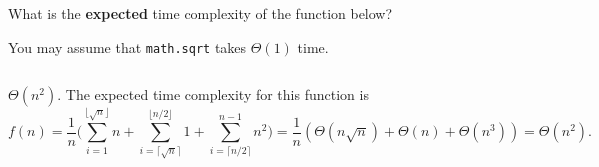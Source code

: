 \begin{prob}
    What is the \textbf{expected} time complexity of the function below?

    You may assume that \texttt{math.sqrt} takes $\Theta(1)$
    time.

    \inputminted{python}{./code.py}

    \begin{soln}
        $\Theta(n^2)$. The expected time complexity for this function is 
        \[ f(n) = \frac{1}{n} \bigg( \sum_{i = 1}^{\lfloor \sqrt{n} \rfloor} n + \sum_{i = \lceil \sqrt{n} \rceil}^{\lfloor n/2 \rfloor} 1 
        + \sum_{i = \lceil n/2 \rceil}^{n - 1} n^2 \bigg)
        = \frac{1}{n} (\Theta(n \sqrt{n}) + \Theta(n) + \Theta(n^3))
        = \Theta(n^2).
        \]
    \end{soln}

\end{prob}
